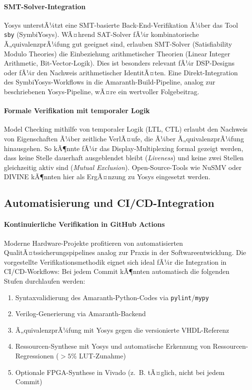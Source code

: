 ﻿\documentclass[12pt,a4paper]{report}
\begin{document}
\paragraph{SMT-Solver-Integration}
Yosys unterstÃ¼tzt eine SMT-basierte Back-End-Verifikation Ã¼ber das Tool \texttt{sby}
(SymbiYosys). WÃ¤hrend SAT-Solver fÃ¼r kombinatorische Ã„quivalenz\-prÃ¼fung gut geeignet sind,
erlauben SMT-Solver (Satisfiability Modulo Theories) die Einbeziehung arithmetischer
Theorien (Linear Integer Arithmetic, Bit-Vector-Logik). Dies ist besonders relevant fÃ¼r
DSP-Designs oder fÃ¼r den Nachweis arithmetischer IdentitÃ¤ten. Eine Direkt-Integration
des SymbiYosys-Workflows in die Amaranth-Build-Pipeline, analog zur beschriebenen
Yosys-Pipeline, wÃ¤re ein wertvoller Folgebeitrag.

\paragraph{Formale Verifikation mit temporaler Logik}
Model Checking mithilfe von temporaler Logik (LTL, CTL) erlaubt den Nachweis von
Eigenschaften Ã¼ber zeitliche VerlÃ¤ufe, die Ã¼ber Ã„quivalenzprÃ¼fung hinausgehen. So kÃ¶nnte
fÃ¼r das Display-Multiplexing formal gezeigt werden, dass keine Stelle dauerhaft
ausgeblendet bleibt (\textit{Liveness}) und keine zwei Stellen gleichzeitig aktiv sind
(\textit{Mutual Exclusion}). Open-Source-Tools wie NuSMV oder DIVINE kÃ¶nnten hier als
ErgÃ¤nzung zu Yosys eingesetzt werden.

\subsection{Automatisierung und CI/CD-Integration}

\paragraph{Kontinuierliche Verifikation in GitHub Actions}
Moderne Hardware-Projekte profitieren von automatisierten QualitÃ¤tssicherungspipelines
analog zur Praxis in der Softwareentwicklung. Die vorgestellte Verifikationsmethodik
eignet sich ideal fÃ¼r die Integration in CI/CD-Workflows: Bei jedem Commit kÃ¶nnten
automatisch die folgenden Stufen durchlaufen werden:

\begin{enumerate}
  \item Syntaxvalidierung des Amaranth-Python-Codes via \texttt{pylint}/\texttt{mypy}
  \item Verilog-Generierung via Amaranth-Backend
  \item Ã„quivalenzprÃ¼fung mit Yosys gegen die versionierte VHDL-Referenz
  \item Ressourcen-Synthese mit Yosys und automatische Erkennung von
        Ressourcen-Regres\-sionen ($>5\%$ LUT-Zunahme)
  \item Optionale FPGA-Synthese in Vivado (z.~B. tÃ¤glich, nicht bei jedem Commit)
\end{enumerate}
\end{document}
